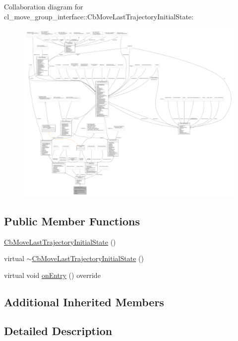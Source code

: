 Collaboration diagram for cl\+\_\+move\+\_\+group\+\_\+interface\+:\+:Cb\+Move\+Last\+Trajectory\+Initial\+State\+:
\nopagebreak
\begin{figure}[H]
\begin{center}
\leavevmode
\includegraphics[width=350pt]{classcl__move__group__interface_1_1CbMoveLastTrajectoryInitialState__coll__graph}
\end{center}
\end{figure}
\subsection*{Public Member Functions}
\begin{DoxyCompactItemize}
\item 
\hyperlink{classcl__move__group__interface_1_1CbMoveLastTrajectoryInitialState_afbd94e504bf292115bd331d8d0f76266}{Cb\+Move\+Last\+Trajectory\+Initial\+State} ()
\item 
virtual \hyperlink{classcl__move__group__interface_1_1CbMoveLastTrajectoryInitialState_a9774589e8b72e402d5bc8be37cd70a60}{$\sim$\+Cb\+Move\+Last\+Trajectory\+Initial\+State} ()
\item 
virtual void \hyperlink{classcl__move__group__interface_1_1CbMoveLastTrajectoryInitialState_ad51f4883ea1f7442875cda06c3d474c3}{on\+Entry} () override
\end{DoxyCompactItemize}
\subsection*{Additional Inherited Members}


\subsection{Detailed Description}


